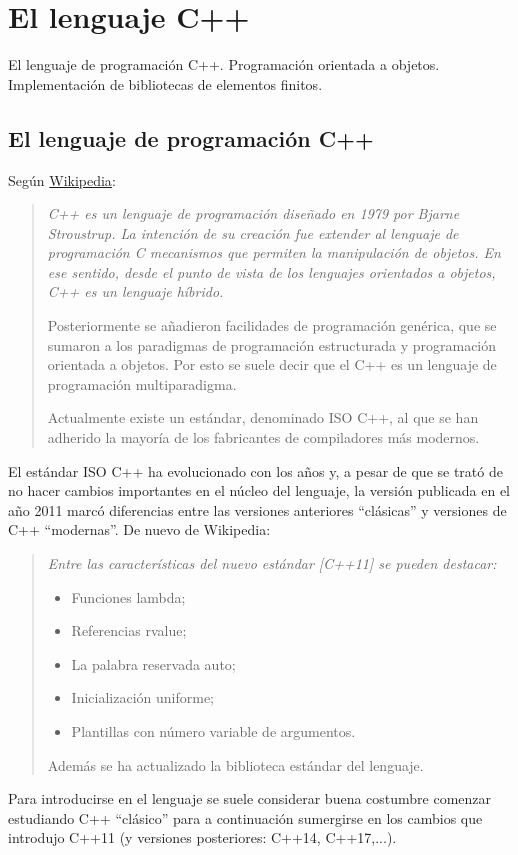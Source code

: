 
\section{El lenguaje C++}

\begin{contenidos}
  El lenguaje de programación C++. Programación orientada a
  objetos. Implementación de bibliotecas de elementos finitos.
\end{contenidos}


\subsection{El lenguaje de programación C++}
\label{sec:el-lenguaje-c++}

Según \href{https://es.wikipedia.org/wiki/C\%2B\%2B}{Wikipedia}:
\begin{quote}\it
  C++ es un lenguaje de programación diseñado en 1979 por Bjarne Stroustrup. La intención de su creación fue extender al lenguaje de programación C mecanismos que permiten la manipulación de objetos. En ese sentido, desde el punto de vista de los lenguajes orientados a objetos, C++ es un lenguaje híbrido.

Posteriormente se añadieron facilidades de programación genérica, que se sumaron a los paradigmas de programación estructurada y programación orientada a objetos. Por esto se suele decir que el C++ es un lenguaje de programación multiparadigma.

Actualmente existe un estándar, denominado ISO C++, al que se han adherido la mayoría de los fabricantes de compiladores más modernos.
\end{quote}

El estándar ISO C++ ha evolucionado con los años y, a pesar de que se trató de no hacer cambios importantes en el núcleo del lenguaje, la versión publicada en el año 2011 marcó diferencias entre las versiones anteriores ``clásicas'' y versiones de C++ ``modernas''. De nuevo de Wikipedia:

\begin{quote}\it
  Entre las características del nuevo estándar [C++11] se pueden destacar:
  \begin{itemize}
  \item Funciones lambda;
  \item Referencias rvalue;
  \item La palabra reservada auto;
  \item Inicialización uniforme;
  \item Plantillas con número variable de argumentos.
  \end{itemize}
  Además se ha actualizado la biblioteca estándar del lenguaje.
\end{quote}
Para introducirse en el lenguaje se suele considerar buena costumbre comenzar estudiando C++ ``clásico'' para a continuación sumergirse en los cambios que introdujo C++11 (y versiones posteriores: C++14, C++17,...).

